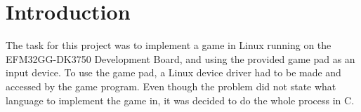 \section{Introduction}
The task for this project was to implement a game in Linux running on the EFM32GG-DK3750 Development Board, and using the provided game pad as an input device.
To use the game pad, a Linux device driver had to be made and accessed by the game program.
Even though the problem did not state what language to implement the game in, it was decided to do the whole process in C.

